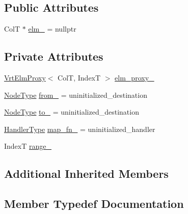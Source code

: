 \subsection*{Public Attributes}
\begin{DoxyCompactItemize}
\item 
ColT $\ast$ \hyperlink{structvt_1_1vrt_1_1collection_1_1_migrate_msg_aa074fd362c469f1a0aae30d1cf9888bf}{elm\+\_\+} = nullptr
\end{DoxyCompactItemize}
\subsection*{Private Attributes}
\begin{DoxyCompactItemize}
\item 
\hyperlink{structvt_1_1vrt_1_1collection_1_1_vrt_elm_proxy}{Vrt\+Elm\+Proxy}$<$ ColT, IndexT $>$ \hyperlink{structvt_1_1vrt_1_1collection_1_1_migrate_msg_a1c6c855daa4709e8eecda251704e9f6e}{elm\+\_\+proxy\+\_\+}
\item 
\hyperlink{namespacevt_a866da9d0efc19c0a1ce79e9e492f47e2}{Node\+Type} \hyperlink{structvt_1_1vrt_1_1collection_1_1_migrate_msg_a1b6255e6321bcac5244caf9f01c1fb47}{from\+\_\+} = uninitialized\+\_\+destination
\item 
\hyperlink{namespacevt_a866da9d0efc19c0a1ce79e9e492f47e2}{Node\+Type} \hyperlink{structvt_1_1vrt_1_1collection_1_1_migrate_msg_a8bb8dc33230f27eef17bc2beb07ab32a}{to\+\_\+} = uninitialized\+\_\+destination
\item 
\hyperlink{namespacevt_af64846b57dfcaf104da3ef6967917573}{Handler\+Type} \hyperlink{structvt_1_1vrt_1_1collection_1_1_migrate_msg_a9ceb1e051ce61da4c6ad5689ec88935e}{map\+\_\+fn\+\_\+} = uninitialized\+\_\+handler
\item 
IndexT \hyperlink{structvt_1_1vrt_1_1collection_1_1_migrate_msg_aa5ae1696b48cdc6cfbc27cebe492b4be}{range\+\_\+}
\end{DoxyCompactItemize}
\subsection*{Additional Inherited Members}


\subsection{Member Typedef Documentation}
\mbox{\label{structvt_1_1vrt_1_1collection_1_1_migrate_msg_a3453db7704db7db17a7afef046dba844}} 
